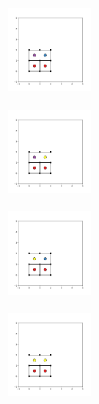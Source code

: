 \begin{figure}[bt]
	\begin{subfigure}[b]{0.19\textwidth}
         \centering
         \includegraphics[height=2.2cm]{./figures/procrystals/2x2_10.pdf}
         \caption{}
         \label{fig:et2x2_0}
     \end{subfigure}
     \hfill          
     \begin{subfigure}[b]{0.19\textwidth}
         \centering
         \includegraphics[height=2.2cm]{./figures/procrystals/2x2_11.pdf}
         \caption{}
         \label{fig:et2x2_1}
     \end{subfigure}
     \hfill
     \begin{subfigure}[b]{0.19\textwidth}
         \centering
         \includegraphics[height=2.2cm]{./figures/procrystals/2x2_15.pdf}
         \caption{}
         \label{fig:et2x2_2}
     \end{subfigure}
     \hfill
     \begin{subfigure}[b]{0.19\textwidth}
         \centering
         \includegraphics[height=2.2cm]{./figures/procrystals/2x2_16.pdf}
         \caption{}
         \label{fig:et2x2_3}
     \end{subfigure}
     \hfill
	
	\vspace{0.5cm}    
    

\end{figure}
